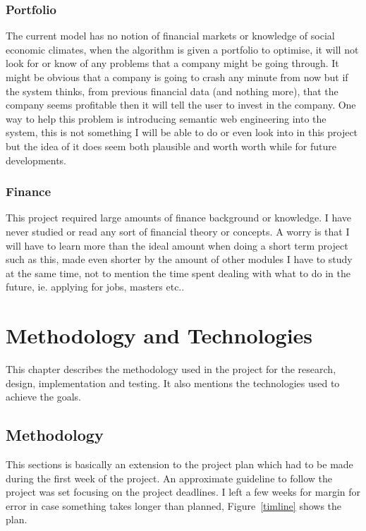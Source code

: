 \documentclass{pdfmx4020}
\begin{document}
    \subsection{Portfolio} %
    \label{sub:portfolio}
      The current model has no notion of financial markets or knowledge of social economic climates, when the algorithm is given a portfolio to optimise, it will not look for or know of any problems that a company might be going through. It might be obvious that a company is going to crash any minute from now but if the system thinks, from previous financial data (and nothing more), that the company seems profitable then it will tell the user to invest in the company. One way to help this problem is introducing semantic web engineering into the system, this is not something I will be able to do or even look into in this project but the idea of it does seem both plausible and worth worth while for future developments.
    \subsection{Finance} %
    \label{sub:finance}
      This project required large amounts of finance background or knowledge. I have never studied or read any sort of financial theory or concepts. A worry is that I will have to learn more than the ideal amount when doing a short term project such as this, made even shorter by the amount of other modules I have to study at the same time, not to mention the time spent dealing with what to do in the future, ie. applying for jobs, masters etc.. 


\chapter{Methodology and Technologies}
  This chapter describes the methodology used in the project for the research, design, implementation and testing. It also mentions the technologies used to achieve the goals. 
  \section{Methodology} %
  \label{sec:methodology}
  This sections is basically an extension to the project plan which had to be made during the first week of the project. An approximate guideline to follow the project was set focusing on the project deadlines. I left a few weeks for margin for error in case something takes longer than planned, Figure~\ref{timline} shows the plan. 
\end{document}
